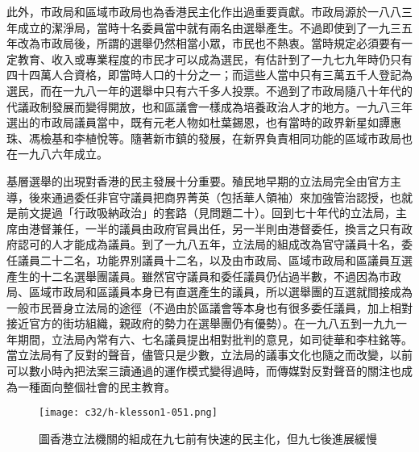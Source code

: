 
此外，市政局和區域市政局也為香港民主化作出過重要貢獻。市政局源於一八八三年成立的潔淨局，當時十名委員當中就有兩名由選舉產生。不過即使到了一九三五年改為市政局後，所謂的選舉仍然相當小眾，市民也不熱衷。當時規定必須要有一定教育、收入或專業程度的市民才可以成為選民，有估計到了一九七九年時仍只有四十四萬人合資格，即當時人口的十分之一；而這些人當中只有三萬五千人登記為選民，而在一九八一年的選舉中只有六千多人投票。不過到了市政局隨八十年代的代議政制發展而變得開放，也和區議會一樣成為培養政治人才的地方。一九八三年選出的市政局議員當中，既有元老人物如杜葉錫恩，也有當時的政界新星如譚惠珠、馮檢基和李植悅等。隨著新市鎮的發展，在新界負責相同功能的區域市政局也在一九八六年成立。

基層選舉的出現對香港的民主發展十分重要。殖民地早期的立法局完全由官方主導，後來通過委任非官守議員把商界菁英（包括華人領袖）來加強管治認授，也就是前文提過「行政吸納政治」的套路（見問題二十）。回到七十年代的立法局，主席由港督兼任，一半的議員由政府官員出任，另一半則由港督委任，換言之只有政府認可的人才能成為議員。到了一九八五年，立法局的組成改為官守議員十名，委任議員二十二名，功能界別議員十二名，以及由市政局、區域市政局和區議員互選產生的十二名選舉團議員。雖然官守議員和委任議員仍佔過半數，不過因為市政局、區域市政局和區議員本身已有直選產生的議員，所以選舉團的互選就間接成為一般市民晉身立法局的途徑（不過由於區議會等本身也有很多委任議員，加上相對接近官方的街坊組織，親政府的勢力在選舉團仍有優勢）。在一九八五到一九九一年期間，立法局內常有六、七名議員提出相對批判的意見，如司徒華和李柱銘等。當立法局有了反對的聲音，儘管只是少數，立法局的議事文化也隨之而改變，以前可以數小時內把法案三讀通過的運作模式變得過時，而傳媒對反對聲音的關注也成為一種面向整個社會的民主教育。

\begin{figure}[htbp]
    \centering
    \texttt{[image: c32/h-klesson1-051.png]}
    \caption{圖香港立法機關的組成在九七前有快速的民主化，但九七後進展緩慢} 
\end{figure}


